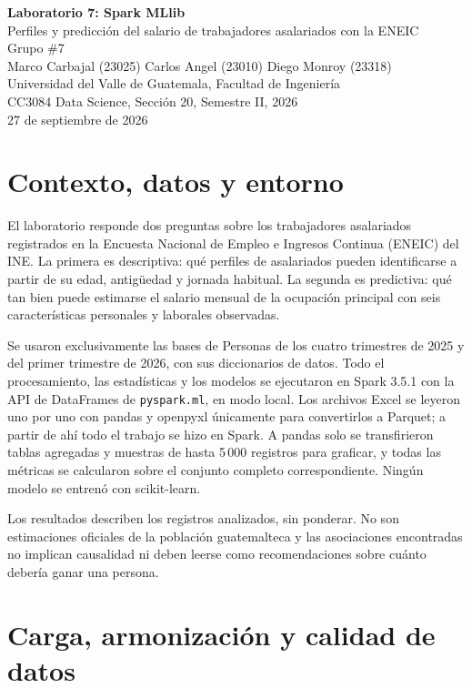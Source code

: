 \documentclass[11pt,a4paper]{article}
\newcommand{\var}[1]{\texttt{#1}}
\begin{document}
\begin{center}
{\LARGE\bfseries Laboratorio 7: Spark MLlib}\\[0.4em]
{\large Perfiles y predicción del salario de trabajadores asalariados con la ENEIC}\\[0.8em]
{\large Grupo \#7}\\[0.4em]
Marco Carbajal (23025) \quad Carlos Angel (23010) \quad Diego Monroy (23318)\\[0.4em]
Universidad del Valle de Guatemala, Facultad de Ingeniería\\
CC3084 Data Science, Sección 20, Semestre II, 2026\\[0.4em]
27 de septiembre de 2026
\end{center}

\section{Contexto, datos y entorno}

El laboratorio responde dos preguntas sobre los trabajadores asalariados registrados en la Encuesta Nacional de Empleo e Ingresos Continua (ENEIC) del INE. La primera es descriptiva: qué perfiles de asalariados pueden identificarse a partir de su edad, antigüedad y jornada habitual. La segunda es predictiva: qué tan bien puede estimarse el salario mensual de la ocupación principal con seis características personales y laborales observadas.

Se usaron exclusivamente las bases de Personas de los cuatro trimestres de 2025 y del primer trimestre de 2026, con sus diccionarios de datos. Todo el procesamiento, las estadísticas y los modelos se ejecutaron en Spark 3.5.1 con la API de DataFrames de \var{pyspark.ml}, en modo local. Los archivos Excel se leyeron uno por uno con pandas y openpyxl únicamente para convertirlos a Parquet; a partir de ahí todo el trabajo se hizo en Spark. A pandas solo se transfirieron tablas agregadas y muestras de hasta 5\,000 registros para graficar, y todas las métricas se calcularon sobre el conjunto completo correspondiente. Ningún modelo se entrenó con scikit-learn.

Los resultados describen los registros analizados, sin ponderar. No son estimaciones oficiales de la población guatemalteca y las asociaciones encontradas no implican causalidad ni deben leerse como recomendaciones sobre cuánto debería ganar una persona.

\section{Carga, armonización y calidad de datos}
\end{document}
